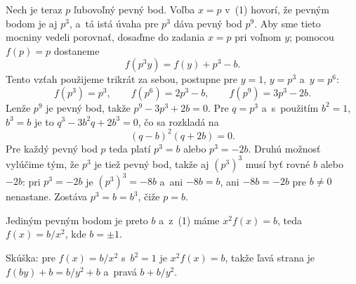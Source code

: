 {    Nech je teraz $p$ ľubovoľný pevný bod. Voľba $x=p$ v~(1) hovorí, že pevným bodom je aj $p^3$, a~tá istá úvaha pre $p^3$ dáva pevný bod $p^9$. Aby sme tieto mocniny vedeli porovnať, dosaďme do zadania $x=p$ pri voľnom $y$; pomocou $f(p)=p$ dostaneme
    $$
    f(p^3y) = f(y)+p^3-b.
    $$
    Tento vzťah použijeme trikrát za sebou, postupne pre $y=1$, $y=p^3$ a~$y=p^6$:
    $$
    f(p^3)=p^3,\qquad f(p^6)=2p^3-b,\qquad f(p^9)=3p^3-2b.
    $$
    Lenže $p^9$ je pevný bod, takže $p^9-3p^3+2b=0$. Pre $q=p^3$ a~s~použitím $b^2=1$, $b^3=b$ je to $q^3-3b^2q+2b^3=0$, čo sa rozkladá na
    $$
    (q-b)^2(q+2b) = 0.
    $$
    Pre každý pevný bod $p$ teda platí $p^3=b$ alebo $p^3=-2b$. Druhú možnosť vylúčime tým, že $p^3$ je tiež pevný bod, takže aj $(p^3)^3$ musí byť rovné $b$ alebo $-2b$: pri $p^3=-2b$ je $(p^3)^3=-8b$ a~ani $-8b=b$, ani $-8b=-2b$ pre $b\neq0$ nenastane. Zostáva $p^3=b=b^3$, čiže $p=b$.

    Jediným pevným bodom je preto $b$ a~z~(1) máme $x^2f(x)=b$, teda $f(x)=b/x^2$, kde $b=\pm1$.

    Skúška: pre $f(x)=b/x^2$ s~$b^2=1$ je $x^2f(x)=b$, takže ľavá strana je $f(by)+b=b/y^2+b$ a~pravá $b+b/y^2$.
}

